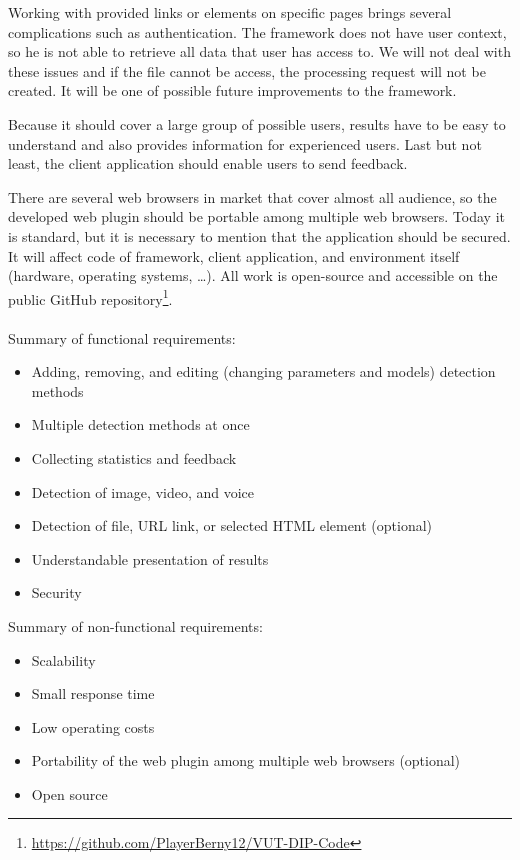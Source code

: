 Working with provided links or elements on specific pages brings several complications such as authentication. The framework does not have user context, so he is not able to retrieve all data that user has access to. We will not deal with these issues and if the file cannot be access, the processing request will not be created. It will be one of possible future improvements to the framework.

Because it should cover a large group of possible users, results have to be easy to understand and also provides information for experienced users. Last but not least, the client application should enable users to send feedback.

There are several web browsers in market that cover almost all audience, so the developed web plugin should be portable among multiple web browsers. Today it is standard, but it is necessary to mention that the application should be secured. It will affect code of framework, client application, and environment itself (hardware, operating systems, …). All work is open-source and accessible on the public GitHub repository\footnote{\url{https://github.com/PlayerBerny12/VUT-DIP-Code}}.
\\\\
\noindent Summary of functional requirements:
\begin{itemize}
\item Adding, removing, and editing (changing parameters and models) detection methods
\item Multiple detection methods at once
\item Collecting statistics and feedback
\item Detection of image, video, and voice
\item Detection of file, URL link, or selected HTML element (optional)
\item Understandable presentation of results
\item Security
\end{itemize}

\noindent Summary of non-functional requirements:
\begin{itemize}
\item Scalability
\item Small response time
\item Low operating costs
\item Portability of the web plugin among multiple web browsers (optional)
\item Open source
\end{itemize}

